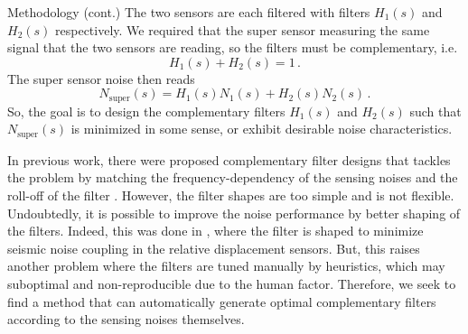 \documentclass{beamer}
\begin{document}
\begin{frame}[t]
\begin{columns}[t]
		\begin{column}{0.32\linewidth}
			\begin{block}{Methodology (cont.)}
				The two sensors are each filtered with filters $H_1(s)$ and $H_2(s)$ respectively.
				We required that the super sensor measuring the same signal that the two sensors are reading, so the filters must be complementary, i.e.
				\begin{equation}
					H_1(s) + H_2(s) = 1\,.
				\end{equation}
				The super sensor noise then reads
				\begin{equation}
					N_\text{super}(s) = H_1(s)N_1(s) + H_2(s)N_2(s)\,.
					\label{eqn:noise_super}
				\end{equation}
				So, the goal is to design the complementary filters $H_1(s)$ and $H_2(s)$ such that $N_\text{super}(s)$ is minimized in some sense, or exhibit desirable noise characteristics.
				
				\medskip
				
				In previous work, there were proposed complementary filter designs that tackles the problem by matching the frequency-dependency of the sensing noises and the roll-off of the filter \cite{Sekiguchi:2016bmv, vanHeijningen:2018cpc}.
				However, the filter shapes are too simple and is not flexible.
				Undoubtedly, it is possible to improve the noise performance by better shaping of the filters.
				Indeed, this was done in \cite{low_frequency_optimization_and_performance_of_advanced_virgo_seismic_isolation_system}, where the filter is shaped to minimize seismic noise coupling in the relative displacement sensors.
				But, this raises another problem where the filters are tuned manually by heuristics, which may suboptimal and non-reproducible due to the human factor.
				Therefore, we seek to find a method that can automatically generate optimal complementary filters according to the sensing noises themselves.
				
				\medskip
				

\end{block}
\end{column}
\end{columns}
\end{frame}
\end{document}
